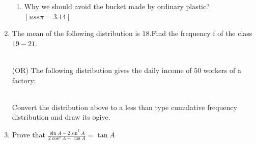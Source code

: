 \documentclass{article}
\begin{document}
\begin{enumerate}
\begin{enumerate}[label=\roman*)]
			\item Why we should avoid the bucket made by ordinary plastic? $[use\pi=3.14]$
		\end{enumerate}
	\item The mean of the following distribution is $18$.Find the frequency f of the class $19-21$.\\
		\begin{table}[htb]
			\centering
		\end{table}\\
		(OR)
		The following distribution gives the daily income of $50$ workers of a factory:\\
		\begin{table}[htb]
			\centering
		\end{table}\\
		Convert the distribution above to a less than type cumulative frequency distribution and draw its ogive.
	\item Prove that $\frac{\sin A - 2\sin^3 A}{2\cos^3 A - \cos A} = \tan A$
\end{enumerate}
\end{document}

